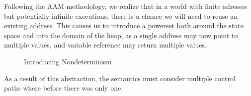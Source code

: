 Following the AAM methodology, we realize that in a world with finite adresses
but potentially infinite executions, there is a chance we will need to reuse an
existing address.
%
This causes us to introduce a powerset both around the state space and into the
domain of the heap, as a single address may now point to multiple values, and
variable reference may return multiple values.
%
\begin{figure}[H]
\caption*{Introducing Nondeterminism}
\end{figure}
\noindent
%
As a result of this abstraction, the semantics must consider multiple control
paths where before there was only one.
